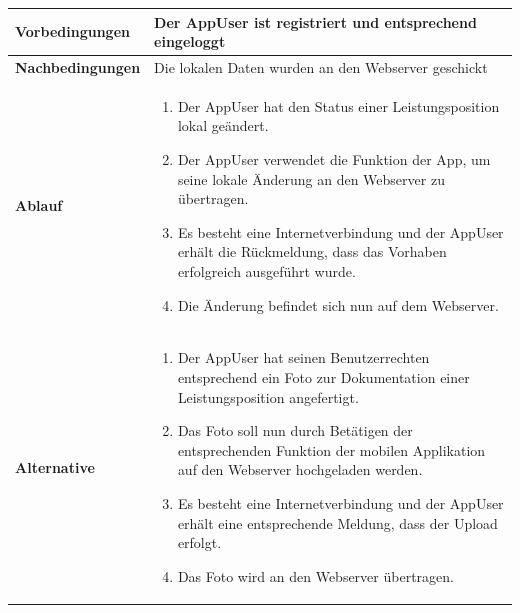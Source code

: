 \begin{longtable}[c]{|p{4cm}|p{10cm}|}
    \textbf{Vorbedingungen}             & Der AppUser ist registriert und entsprechend eingeloggt                                                                                                                                                                                                                                                                  \\ \hline
    \textbf{Nachbedingungen}            & Die lokalen Daten wurden an den Webserver geschickt                                                                                                                                                                                                                                                                      \\ \hline
    \textbf{Ablauf}                     &
    \begin{enumerate}
        \item Der AppUser hat den Status einer Leistungsposition lokal ge\"andert.
        \item Der AppUser verwendet die Funktion der App,  um seine lokale \"Anderung an den Webserver zu \"ubertragen.
        \item Es besteht eine Internetverbindung und der AppUser erh\"alt die R\"uckmeldung, dass das Vorhaben erfolgreich ausgef\"uhrt wurde.
        \item Die \"Anderung befindet sich nun auf dem Webserver.
    \end{enumerate}                                                                                                                                                                                                                                                                                                                                      \\ \hline
    \textbf{Alternative}                &
    \begin{enumerate}
        \item Der AppUser hat seinen Benutzerrechten entsprechend ein Foto zur Dokumentation einer Leistungsposition angefertigt.
        \item Das Foto soll nun durch Bet\"atigen der entsprechenden Funktion der mobilen Applikation auf den Webserver hochgeladen werden.
        \item Es besteht eine Internetverbindung und der AppUser erh\"alt eine entsprechende Meldung,  dass der Upload erfolgt.
        \item Das Foto wird an den Webserver \"ubertragen.

\end{enumerate}
\end{longtable}
